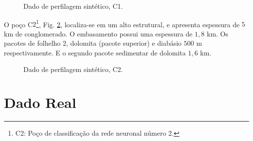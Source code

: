 \begin{figure}[H]
	\centering
	\setlength{\fboxsep}{8pt}
	\setlength{\fboxrule}{0.1pt}
	\caption{Dado de perfilagem sintético, C1.}
	\label{C1}
\end{figure}

O poço C$2$\footnote{C2: Poço de classificação da rede neuronal número 2.}, Fig. \ref{C2}, localiza-se em um alto estrutural, e apresenta espessura de $5$ km de conglomerado. O embasamento possui uma espessura de $1,8$ km. Os pacotes de folhelho 2, dolomita (pacote superior) e diabásio $500$ m respectivamente. E o segundo pacote sedimentar de dolomita $1,6$ km.

\begin{figure}[H]
	\centering
	\setlength{\fboxsep}{8pt}
	\setlength{\fboxrule}{0.1pt}
	\caption{Dado de perfilagem sintético, C2.}
	\label{C2}
\end{figure}

\section{Dado Real}

